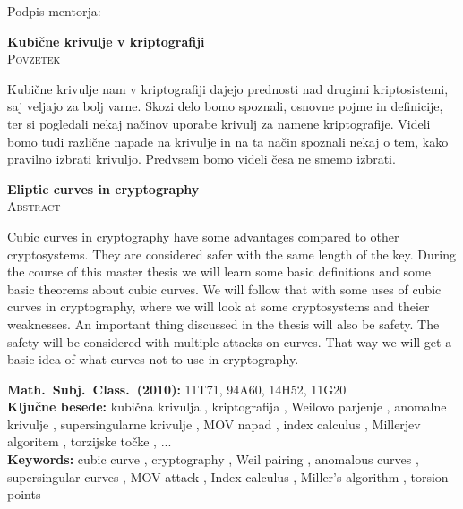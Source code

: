 \documentclass[12pt,a4paper,twoside]{article}
\newcommand{\naslovdela}{Kubične krivulje v kriptografiji}
\newcommand{\kljucnebesede}{kubična krivulja \sep kriptografija \sep Weilovo parjenje \sep anomalne krivulje \sep supersingularne krivulje \sep MOV napad \sep index calculus \sep Millerjev algoritem \sep torzijske točke \sep ...} %
\newcommand{\keywords}{cubic curve \sep cryptography \sep Weil pairing \sep anomalous curves \sep supersingular curves \sep MOV attack \sep Index calculus \sep Miller's algorithm \sep torsion points} %
\newcommand{\sep}{, }  %
\theoremstyle{definition} %
\theoremstyle{plain} %
\numberwithin{equation}{section}  %
\begin{document}
\vspace{2cm}
\hspace*{\fill} Podpis mentorja: \phantom{prostor za podpis}


\cleardoublepage
{}

\begin{center}
\textbf{\naslovdela} \\[3mm]
\textsc{Povzetek} \\[2mm]
\end{center}
Kubične krivulje nam v kriptografiji dajejo prednosti nad drugimi kriptosistemi, saj veljajo za bolj varne. Skozi delo bomo spoznali, osnovne pojme in definicije, ter si pogledali nekaj načinov uporabe krivulj za namene kriptografije. Videli bomo tudi različne napade na krivulje in na ta način spoznali nekaj o tem, kako pravilno izbrati krivuljo. Predvsem bomo videli česa ne smemo izbrati.

\vfill
\begin{center}
\textbf{Eliptic curves in cryptography} \\[3mm] %
\textsc{Abstract}\\[2mm]
\end{center}

Cubic curves in cryptography have some advantages compared to other cryptosystems. They are considered safer with the same length of the key. During the course of this master thesis we will learn some basic definitions and some basic theorems about cubic curves. We will follow that with some uses of cubic curves in cryptography, where we will look at some cryptosystems and theier weaknesses. An important thing discussed in the thesis will also be safety. The safety will be considered with multiple attacks on curves. That way we will get a basic idea of what curves not to use in cryptography. 

\vfill\noindent
\textbf{Math.~Subj.~Class.~(2010):}	11T71, 94A60, 14H52, 11G20  \\[1mm]
\textbf{Ključne besede:} \kljucnebesede \\[1mm]
\textbf{Keywords:} \keywords

\cleardoublepage

\setcounter{page}{1}    %
\end{document}
